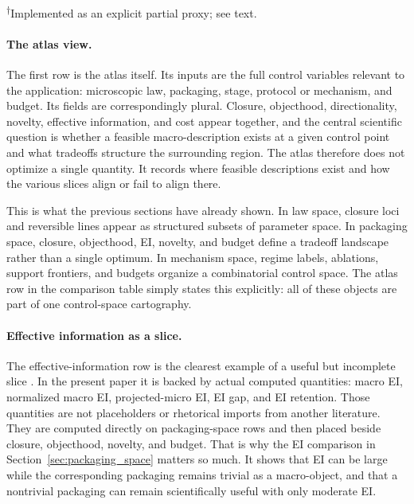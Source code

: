 \documentclass[11pt]{article}
\theoremstyle{definition}
\begin{document}
\begin{table}[t]
    \vspace{2pt}
    {\scriptsize \textsuperscript{$\dagger$}Implemented as an explicit partial proxy; see text.}
\end{table}

\paragraph{The atlas view.}
The first row is the atlas itself. Its inputs are the full control variables relevant to the application: microscopic law, packaging, stage, protocol or mechanism, and budget. Its fields are correspondingly plural. Closure, objecthood, directionality, novelty, effective information, and cost appear together, and the central scientific question is whether a feasible macro-description exists at a given control point and what tradeoffs structure the surrounding region. The atlas therefore does not optimize a single quantity. It records where feasible descriptions exist and how the various slices align or fail to align there.

This is what the previous sections have already shown. In law space, closure loci and reversible lines appear as structured subsets of parameter space. In packaging space, closure, objecthood, EI, novelty, and budget define a tradeoff landscape rather than a single optimum. In mechanism space, regime labels, ablations, support frontiers, and budgets organize a combinatorial control space. The atlas row in the comparison table simply states this explicitly: all of these objects are part of one control-space cartography.

\paragraph{Effective information as a slice.}
The effective-information row is the clearest example of a useful but incomplete slice \cite{tononi2003measuring,hoel2013causal,hoel2017map,rosas2020reconciling}. In the present paper it is backed by actual computed quantities: macro EI, normalized macro EI, projected-micro EI, EI gap, and EI retention. Those quantities are not placeholders or rhetorical imports from another literature. They are computed directly on packaging-space rows and then placed beside closure, objecthood, novelty, and budget. That is why the EI comparison in Section~\ref{sec:packaging_space} matters so much. It shows that EI can be large while the corresponding packaging remains trivial as a macro-object, and that a nontrivial packaging can remain scientifically useful with only moderate EI.
\end{document}
